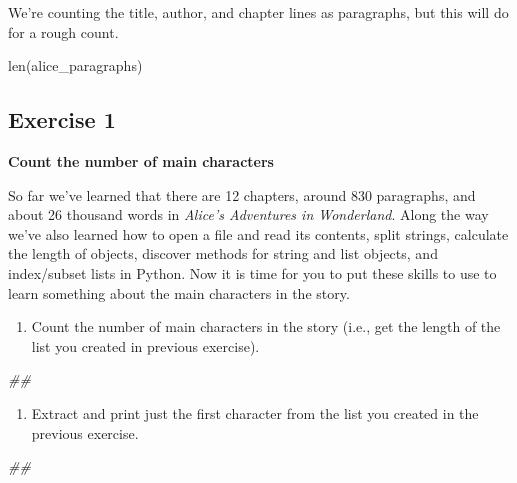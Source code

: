 \documentclass[]{book}
\newenvironment{Shaded}{\begin{snugshade}}{\end{snugshade}}
\newcommand{\BuiltInTok}[1]{#1}
\newcommand{\CommentTok}[1]{\textcolor[rgb]{0.56,0.35,0.01}{\textit{#1}}}
\newcommand{\NormalTok}[1]{#1}
\providecommand{\tightlist}{%
  \setlength{\itemsep}{0pt}\setlength{\parskip}{0pt}}
\begin{document}
We're counting the title, author, and chapter lines as paragraphs, but this will do for a rough count.

\begin{Shaded}
\begin{Highlighting}[]
\BuiltInTok{len}\NormalTok{(alice_paragraphs)}
\end{Highlighting}
\end{Shaded}

\hypertarget{exercise-1-4}{%
\subsection{Exercise 1}\label{exercise-1-4}}

\textbf{Count the number of main characters}

So far we've learned that there are 12 chapters, around 830 paragraphs, and about 26 thousand words in \emph{Alice's Adventures in Wonderland}. Along the way we've also learned how to open a file and read its contents, split strings, calculate the length of objects, discover methods for string and list objects, and index/subset lists in Python. Now it is time for you to put these skills to use to learn something about the main characters in the story.

\begin{enumerate}
\def\labelenumi{\arabic{enumi}.}
\tightlist
\item
  Count the number of main characters in the story (i.e., get the length of the list you created in previous exercise).
\end{enumerate}

\begin{Shaded}
\begin{Highlighting}[]
\CommentTok{##}
\end{Highlighting}
\end{Shaded}

\begin{enumerate}
\def\labelenumi{\arabic{enumi}.}
\setcounter{enumi}{1}
\tightlist
\item
  Extract and print just the first character from the list you created in the previous exercise.
\end{enumerate}

\begin{Shaded}
\begin{Highlighting}[]
\CommentTok{##}
\end{Highlighting}
\end{Shaded}
\end{document}
